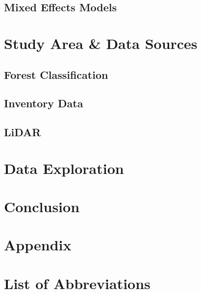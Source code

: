 \documentclass[12pt]{article}
\numberwithin{equation}{section}
\numberwithin{table}{section}
\numberwithin{figure}{section}
\begin{document}
\subsection{Mixed Effects Models} \label{mixed_models}

%



\clearpage

\section{Study Area \& Data Sources}
\subsection{Forest Classification}

\subsection{Inventory Data} \label{Inventory Data}

\subsection{LiDAR} \label{LiDAR}

\clearpage


\section{Data Exploration} \label{Data Exploration}

\clearpage

\section{Conclusion} 

\clearpage



\section*{Appendix} \label{Appendix}


\clearpage



\listoffigures


\clearpage

\listoftables


\clearpage

\section*{List of Abbreviations}




\clearpage



\end{document}
